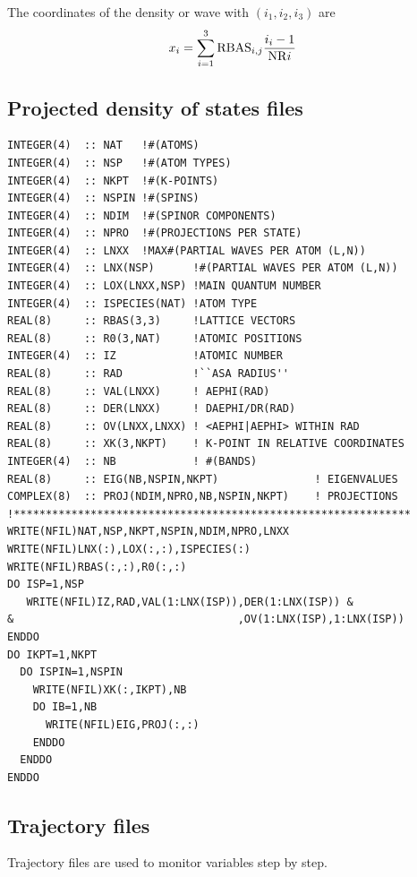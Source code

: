 \documentclass[final,12pt,makeidx,DIV=calc]{article}
\begin{document}
{{{The coordinates of the density or wave with $(i_1,i_2,i_3)$ are 
\begin{equation}
  x_i=\sum_{i=1}^{3} {\rm RBAS}_{i,j}{{i_i-1}\over{{\rm NR}i}} 
\end{equation}

\subsection{Projected density of states files}
\begin{verbatim}
INTEGER(4)  :: NAT   !#(ATOMS)
INTEGER(4)  :: NSP   !#(ATOM TYPES)
INTEGER(4)  :: NKPT  !#(K-POINTS)
INTEGER(4)  :: NSPIN !#(SPINS)
INTEGER(4)  :: NDIM  !#(SPINOR COMPONENTS)
INTEGER(4)  :: NPRO  !#(PROJECTIONS PER STATE)
INTEGER(4)  :: LNXX  !MAX#(PARTIAL WAVES PER ATOM (L,N))
INTEGER(4)  :: LNX(NSP)      !#(PARTIAL WAVES PER ATOM (L,N))
INTEGER(4)  :: LOX(LNXX,NSP) !MAIN QUANTUM NUMBER
INTEGER(4)  :: ISPECIES(NAT) !ATOM TYPE
REAL(8)     :: RBAS(3,3)     !LATTICE VECTORS
REAL(8)     :: R0(3,NAT)     !ATOMIC POSITIONS 
INTEGER(4)  :: IZ            !ATOMIC NUMBER
REAL(8)     :: RAD           !``ASA RADIUS''
REAL(8)     :: VAL(LNXX)     ! AEPHI(RAD)
REAL(8)     :: DER(LNXX)     ! DAEPHI/DR(RAD)
REAL(8)     :: OV(LNXX,LNXX) ! <AEPHI|AEPHI> WITHIN RAD
REAL(8)     :: XK(3,NKPT)    ! K-POINT IN RELATIVE COORDINATES
INTEGER(4)  :: NB            ! #(BANDS)
REAL(8)     :: EIG(NB,NSPIN,NKPT)               ! EIGENVALUES
COMPLEX(8)  :: PROJ(NDIM,NPRO,NB,NSPIN,NKPT)    ! PROJECTIONS
!**************************************************************
WRITE(NFIL)NAT,NSP,NKPT,NSPIN,NDIM,NPRO,LNXX
WRITE(NFIL)LNX(:),LOX(:,:),ISPECIES(:)
WRITE(NFIL)RBAS(:,:),R0(:,:)
DO ISP=1,NSP
   WRITE(NFIL)IZ,RAD,VAL(1:LNX(ISP)),DER(1:LNX(ISP)) &
&                                   ,OV(1:LNX(ISP),1:LNX(ISP))
ENDDO
DO IKPT=1,NKPT
  DO ISPIN=1,NSPIN
    WRITE(NFIL)XK(:,IKPT),NB
    DO IB=1,NB
      WRITE(NFIL)EIG,PROJ(:,:)
    ENDDO
  ENDDO
ENDDO
\end{verbatim}


\subsection{Trajectory files}
Trajectory files are used to monitor variables step by step. 

}}}
\end{document}
